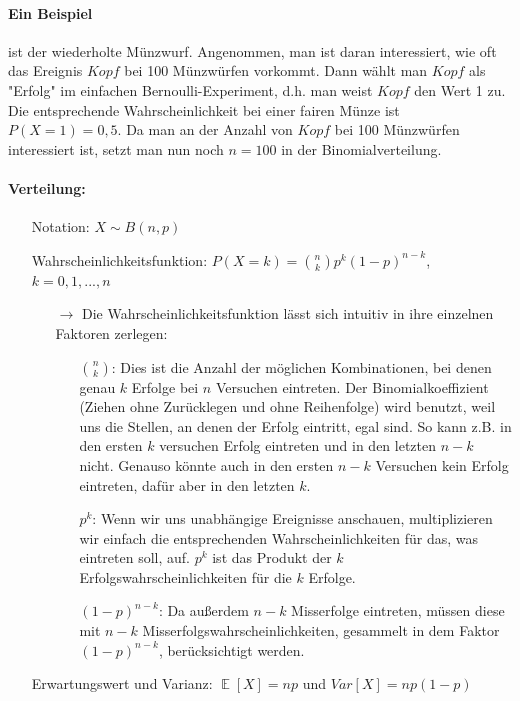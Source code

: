 \documentclass[a4paper]{article}
\DeclareMathOperator*{\E}{\mathbb{E}}
\begin{document}
\paragraph{Ein Beispiel} ist der wiederholte Münzwurf. Angenommen, man ist daran interessiert, wie oft das Ereignis $Kopf$ bei 100 Münzwürfen vorkommt. Dann wählt man $Kopf$ als "Erfolg" im einfachen Bernoulli-Experiment, d.h. man weist $Kopf$ den Wert 1 zu. Die entsprechende Wahrscheinlichkeit bei einer fairen Münze ist $P(X=1)=0,5$. Da man an der Anzahl von $Kopf$ bei 100 Münzwürfen interessiert ist, setzt man nun noch $n=100$ in der Binomialverteilung.

\paragraph{Verteilung:}
\begin{itemize}
\item[] Notation: $X\sim B(n,p)$
\item[] Wahrscheinlichkeitsfunktion: $P(X=k)=\binom{n}{k}p^k(1-p)^{n-k}$, $k=0,1,...,n$
	\begin{itemize}
	\item[$\rightarrow$] Die Wahrscheinlichkeitsfunktion lässt sich intuitiv in ihre einzelnen Faktoren zerlegen:
		\begin{itemize}
		\item[] $\binom{n}{k}$: Dies ist die Anzahl der möglichen Kombinationen, bei denen genau $k$ Erfolge bei $n$ Versuchen eintreten. Der Binomialkoeffizient (Ziehen ohne Zurücklegen und ohne Reihenfolge) wird benutzt, weil uns die Stellen, an denen der Erfolg eintritt, egal sind. So kann z.B. in den ersten $k$ versuchen Erfolg eintreten und in den letzten $n-k$ nicht. Genauso könnte auch in den ersten $n-k$ Versuchen kein Erfolg eintreten, dafür aber in den letzten $k$.
		\item[] $p^k$: Wenn wir uns unabhängige Ereignisse anschauen, multiplizieren wir einfach die entsprechenden Wahrscheinlichkeiten für das, was eintreten soll, auf. $p^k$ ist das Produkt der $k$ Erfolgswahrscheinlichkeiten für die $k$ Erfolge.
		\item[] $(1-p)^{n-k}$: Da außerdem $n-k$ Misserfolge eintreten, müssen diese mit $n-k$ Misserfolgswahrscheinlichkeiten, gesammelt in dem Faktor $(1-p)^{n-k}$, berücksichtigt werden.
		\end{itemize}
	\end{itemize}
\item[] Erwartungswert und Varianz: $\E[X]=np$ und $Var[X]=np(1-p)$
\end{itemize}
\end{document}
